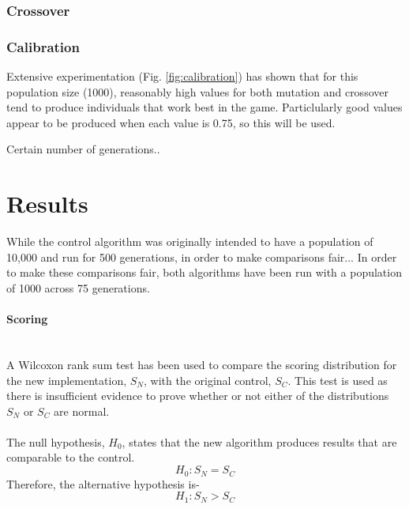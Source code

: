 \documentclass{article}
\newcommand{\myparagraph}[1]{\paragraph{#1}\mbox{}\\}
\begin{document}
\subsubsection{Crossover}


\subsubsection{Calibration}
Extensive experimentation (Fig. \ref{fig:calibration}) has shown that for this population size (1000), reasonably high values for both mutation and crossover tend to produce individuals that work best in the game. Particlularly good values appear to be produced when each value is 0.75, so this will be used.

Certain number of generations..

\section{Results} %


While the control algorithm was originally intended to have a population of 10,000 and run for 500 generations, in order to make comparisons fair...
In order to make these comparisons fair, both algorithms have been run with a population of 1000 across 75 generations.
\myparagraph{Scoring}
A Wilcoxon rank sum test has been used to compare the scoring distribution for the new implementation, $S_N$, with the original control, $S_C$. This test is used as there is insufficient evidence to prove whether or not either of the distributions $S_N$ or $S_C$ are normal.
\\\\
The null hypothesis, $H_0$, states that the new algorithm produces results that are comparable to the control.
\[H_0: S_N = S_C\]
Therefore, the alternative hypothesis is-
\[H_1: S_N > S_C\]
\end{document}
